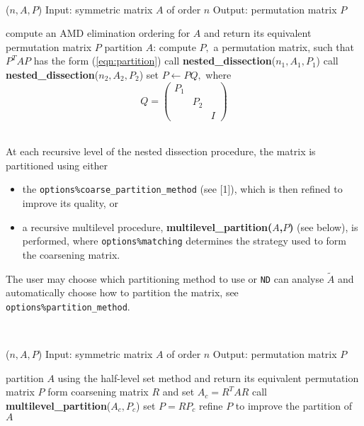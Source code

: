 \noindent\hrulefill\\
\vspace{-1.0em}
\begin{algorithmic}
($n,A,P$)
\STATE Input: symmetric matrix $A$ of order $n$
\STATE Output: permutation matrix $P$

\STATE compute an AMD elimination ordering for $A$ and return its equivalent 
permutation matrix $P$ 
\ELSE
\STATE partition $A$: compute $P,$ a permutation matrix, such that $P^T A P$ 
has the form (\ref{eqn:partition})
\STATE call {\bf nested\_dissection}($n_1,A_1,P_1$)
\STATE call {\bf nested\_dissection}($n_2,A_2,P_2$)
\STATE set $P \leftarrow PQ,$ where $$Q = \left( \begin{array}{ccc} P_1 & & \\ & P_2 & \\ & & I  \end{array} \right)$$
\ENDIF

\end{algorithmic}
\noindent\hrulefill\\

At each recursive level of the nested dissection procedure, the matrix is 
partitioned using either 
\begin{itemize}
\item the {\tt options\%coarse\_partition\_method} (see [1]), which is then refined to improve its 
quality, or 
\item a recursive multilevel procedure,  \textbf{multilevel\_partition($A$,$P$)} (see below), 
is performed, where \texttt{options\%matching} determines the strategy used to form 
the coarsening matrix.
\end{itemize}
The user may choose which partitioning method to use or {\tt ND} can analyse 
$\widetilde{A}$ and automatically choose how to partition the matrix, see 
\texttt{options\%partition\_method}.

\vspace{0.5cm}
\noindent\hrulefill\\
\vspace{-1.0em}
\begin{algorithmic}
($n,A,P$)
\STATE Input: symmetric matrix $A$ of order $n$
\STATE Output: permutation matrix $P$

\STATE partition $A$ using the half-level set method and return its equivalent permutation matrix $P$ 
\ELSE
\STATE form coarsening matrix $R$ and set $A_c = R^T A R$
\STATE call {\bf multilevel\_partition}($A_c,P_c$)
\STATE set $P = RP_c$
\STATE refine $P$ to improve the partition of $A$
\ENDIF

\end{algorithmic}
\noindent\hrulefill


